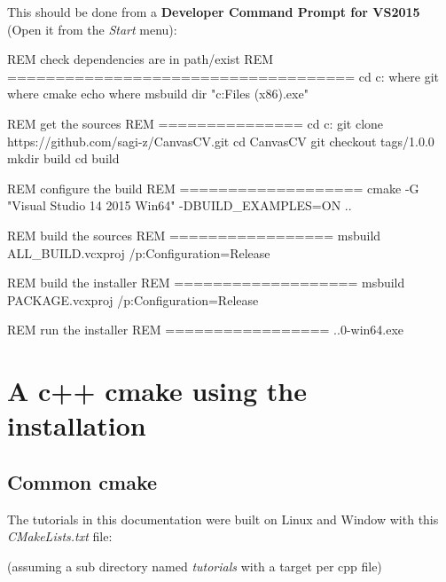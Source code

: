 \begin{DoxyItemize}
\item This should be done from a {\bfseries Developer Command Prompt for V\+S2015} (Open it from the {\itshape Start} menu)\+:
\end{DoxyItemize}

\begin{DoxyVerb}REM check dependencies are in path/exist
REM ====================================
cd c:\users\sagiz
where git
where cmake
echo %
where msbuild
dir "c:\Program Files (x86)\NSIS\NSIS.exe"

REM get the sources
REM ===============
cd c:\users\sagiz
git clone https://github.com/sagi-z/CanvasCV.git
cd CanvasCV
git checkout tags/1.0.0
mkdir build
cd build

REM configure the build
REM ===================
cmake -G "Visual Studio 14 2015 Win64" -DBUILD_EXAMPLES=ON ..

REM build the sources
REM =================
msbuild ALL_BUILD.vcxproj /p:Configuration=Release

REM build the installer
REM ===================
msbuild PACKAGE.vcxproj /p:Configuration=Release

REM run the installer
REM =================
..0-win64.exe
\end{DoxyVerb}
 \hypertarget{cmake}{}\section{A c++ cmake using the installation}\label{cmake}
\hypertarget{cmake_cmakesec1}{}\subsection{Common cmake}\label{cmake_cmakesec1}
The tutorials in this documentation were built on Linux and Window with this {\itshape C\+Make\+Lists.\+txt} file\+:

(assuming a sub directory named {\itshape tutorials} with a target per cpp file)


